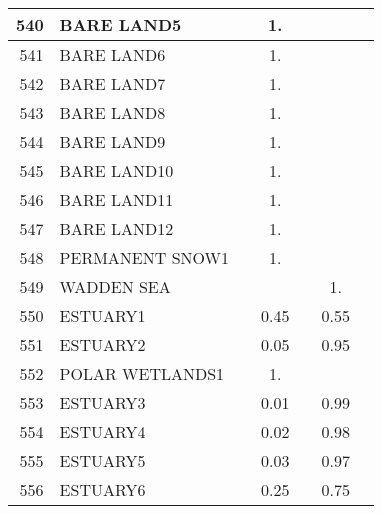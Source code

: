 {{\begin{tabular}{||r|l||c|c|c|c|c||}
 \hline
         540  & BARE LAND5                                                   &       &  1.   &       &       \\
 \hline
         541  & BARE LAND6                                                   &       &  1.   &       &       \\
 \hline
         542  & BARE LAND7                                                   &       &  1.   &       &       \\
 \hline
         543  & BARE LAND8                                                   &       &  1.   &       &       \\
 \hline
         544  & BARE LAND9                                                   &       &  1.   &       &       \\
 \hline
         545  & BARE LAND10                                                  &       &  1.   &       &       \\
 \hline
         546  & BARE LAND11                                                  &       &  1.   &       &       \\
 \hline
         547  & BARE LAND12                                                  &       &  1.   &       &       \\
 \hline
         548  & PERMANENT SNOW1                                              &       &  1.   &       &       \\
 \hline
         549  & WADDEN SEA                                                   &       &       &       &  1.   \\
 \hline
         550  & ESTUARY1                                                     &       &  0.45 &       &  0.55 \\
 \hline
         551  & ESTUARY2                                                     &       &  0.05 &       &  0.95 \\
 \hline
         552  & POLAR WETLANDS1                                              &       &  1.   &       &       \\
 \hline
         553  & ESTUARY3                                                     &       &  0.01 &       &  0.99 \\
 \hline
         554  & ESTUARY4                                                     &       &  0.02 &       &  0.98 \\
 \hline
         555  & ESTUARY5                                                     &       &  0.03 &       &  0.97 \\
 \hline
         556  & ESTUARY6                                                     &       &  0.25 &       &  0.75 \\

\end{tabular}}}
